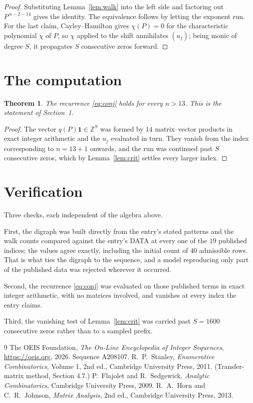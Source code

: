 \documentclass[11pt,a4paper]{article}
\theoremstyle{plain}
\newtheorem{theorem}{Theorem}
\theoremstyle{definition}
\begin{document}
\begin{proof}
Substituting Lemma~\ref{lem:walk} into the left side and factoring out
$P^{\,n-2-14}$ gives the identity. The equivalence follows by letting the exponent
run. For the last claim, Cayley--Hamilton gives $\chi(P)=0$ for the characteristic
polynomial $\chi$ of $P$, so $\chi$ applied to the shift annihilates $(u_j)$; being monic of
degree $S$, it propagates $S$ consecutive zeros forward.
\end{proof}

\section{The computation}

\begin{theorem}
The recurrence \eqref{eq:conj} holds for every $n>13$. This is the statement of
Section~1.
\end{theorem}

\begin{proof}
The vector $q(P)\mathbf{1}\in\mathbb{Z}^{S}$ was formed by $14$ matrix--vector
products in exact integer arithmetic and the $u_j$ evaluated in turn. They vanish from the
index corresponding to $n=13+1$ onwards, and the run was continued past $S$ consecutive
zeros, which by Lemma~\ref{lem:crit} settles every larger index.
\end{proof}

\section{Verification}

Three checks, each independent of the algebra above.

First, the digraph was built directly from the entry's stated patterns and the walk counts
compared against the entry's DATA at every one of the $19$ published indices; the
values agree exactly, including the initial count of $40$ admissible rows. That is
what ties the digraph to the sequence, and a model reproducing only part of the published
data was rejected wherever it occurred.

Second, the recurrence \eqref{eq:conj} was evaluated on those published terms in exact
integer arithmetic, with no matrices involved, and vanishes at every index the entry claims.

Third, the vanishing test of Lemma~\ref{lem:crit} was carried past $S=1600$ consecutive
zeros rather than to a sampled prefix.

\begin{thebibliography}{9}
 The OEIS Foundation, \emph{The On-Line Encyclopedia of Integer
Sequences}, \url{https://oeis.org}, 2026. Sequence A208107.
 R.~P.~Stanley, \emph{Enumerative Combinatorics}, Volume 1, 2nd ed.,
Cambridge University Press, 2011. (Transfer-matrix method, Section 4.7.)
 P.~Flajolet and R.~Sedgewick, \emph{Analytic Combinatorics}, Cambridge
University Press, 2009.
 R.~A.~Horn and C.~R.~Johnson, \emph{Matrix Analysis}, 2nd ed., Cambridge
University Press, 2013.
\end{thebibliography}
\end{document}
